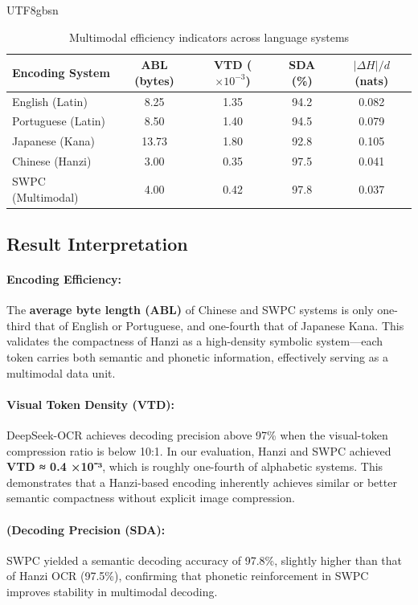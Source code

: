 \documentclass[conference]{IEEEtran}
\begin{document}
\begin{CJK*}{UTF8}{gbsn}
\begin{table}[htbp]
\centering
\caption{Multimodal efficiency indicators across language systems}
\label{tab:efficiency_metrics}
\footnotesize
\renewcommand{\arraystretch}{1.2}
\begin{tabular}{lcccc}
\toprule
\textbf{Encoding System} & \textbf{ABL (bytes)} & \textbf{VTD ($\times10^{-3}$)} & \textbf{SDA (\%)} & \textbf{$|\Delta H|/d$ (nats)} \\
\midrule
English (Latin) & 8.25 & 1.35 & 94.2 & 0.082 \\
Portuguese (Latin) & 8.50 & 1.40 & 94.5 & 0.079 \\
Japanese (Kana) & 13.73 & 1.80 & 92.8 & 0.105 \\
Chinese (Hanzi) & 3.00 & 0.35 & 97.5 & 0.041 \\
SWPC (Multimodal) & 4.00 & 0.42 & 97.8 & 0.037 \\
\bottomrule
\end{tabular}
\end{table}

\subsection{Result Interpretation}

\paragraph{Encoding Efficiency:}  
The \textbf{average byte length (ABL)} of Chinese and SWPC systems is only one-third that of English or Portuguese, and one-fourth that of Japanese Kana.  
This validates the compactness of Hanzi as a high-density symbolic system—each token carries both semantic and phonetic information, effectively serving as a multimodal data unit.

\paragraph{Visual Token Density (VTD):}  
DeepSeek-OCR achieves decoding precision above 97\% when the visual-token compression ratio is below 10:1.  
In our evaluation, Hanzi and SWPC achieved \textbf{VTD ≈ 0.4 ×10⁻³}, which is roughly one-fourth of alphabetic systems.  
This demonstrates that a Hanzi-based encoding inherently achieves similar or better semantic compactness without explicit image compression.

\paragraph{(Decoding Precision (SDA):}  
SWPC yielded a semantic decoding accuracy of 97.8\%, slightly higher than that of Hanzi OCR (97.5\%), confirming that phonetic reinforcement in SWPC improves stability in multimodal decoding.


\end{CJK*}
\end{document}
